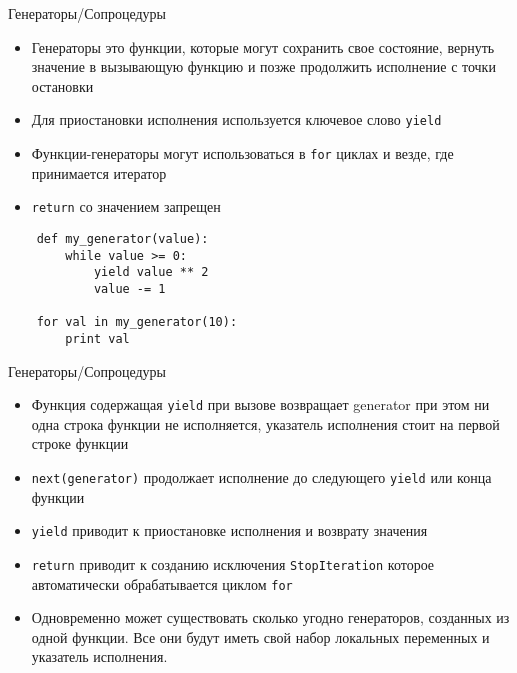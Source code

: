 \documentclass{article}
\begin{document}
\begin{center} Генераторы/Сопроцедуры \end{center}
\begin{itemize}
    \item Генераторы это функции, которые могут сохранить свое состояние, вернуть 
        значение в вызывающую функцию и позже продолжить исполнение с точки остановки
    \item Для приостановки исполнения используется ключевое слово \lstinline!yield!
    \item Функции-генераторы могут использоваться в \LARGE\lstinline!for! циклах и везде, где
        принимается итератор
    \item \lstinline!return! со значением запрещен
\end{itemize}
\vspace{15pt}
\begin{lstlisting}
    def my_generator(value):
        while value >= 0:
            yield value ** 2
            value -= 1

    for val in my_generator(10):
        print val
\end{lstlisting}
\newpage

\begin{center} Генераторы/Сопроцедуры \end{center}
\begin{itemize}
    \item Функция содержащая \lstinline!yield! при вызове возвращает generator
        при этом ни одна строка функции не исполняется, указатель исполнения стоит 
        на первой строке функции
    \item \lstinline!next(generator)! продолжает исполнение до следующего 
        \lstinline!yield! или конца функции
    \item \lstinline!yield! приводит к приостановке исполнения и возврату значения
    \item \lstinline!return! приводит к созданию исключения \lstinline!StopIteration!
        которое автоматически обрабатывается циклом \lstinline!for!
    \item Одновременно может существовать сколько угодно генераторов, созданных из одной функции.
        Все они будут иметь свой набор локальных переменных и указатель исполнения.
\end{itemize}
\newpage
\end{document}
